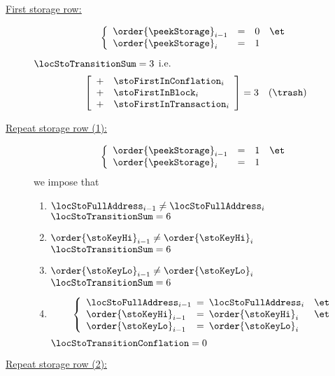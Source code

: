 \begin{description}
	\item[\underline{\underline{First storage row:}}] 
		\If
		\[
			\left\{ \begin{array}{lclc}
				\order{\peekStorage} _{i - 1} & = & 0  & \et \\
				\order{\peekStorage} _{i}     & = & 1 \\
			\end{array} \right.
		\]
		\Then $\locStoTransitionSum = 3$ i.e.
		\[
			\left[ \begin{array}{cl}
				+ & \stoFirstInConflation  _{i} \\
				+ & \stoFirstInBlock       _{i} \\
				+ & \stoFirstInTransaction _{i} \\
			\end{array} \right]
			= 3 \quad (\trash)
		\]
	\item[\underline{\underline{Repeat storage row (1):}}] 
		\If
		\[
			\left\{ \begin{array}{lclc}
				\order{\peekStorage} _{i - 1} & = & 1  & \et \\
				\order{\peekStorage} _{i}     & = & 1 \\
			\end{array} \right.
		\]
		\Then we impose that
		\begin{enumerate}
			\item \If $\locStoFullAddress  _{i - 1} \neq \locStoFullAddress  _{i}$ \Then $\locStoTransitionSum = 6$
			\item \If $\order{\stoKeyHi}   _{i - 1} \neq \order{\stoKeyHi}   _{i}$ \Then $\locStoTransitionSum = 6$
			\item \If $\order{\stoKeyLo}   _{i - 1} \neq \order{\stoKeyLo}   _{i}$ \Then $\locStoTransitionSum = 6$
			\item  \If 
				\[
					\left\{ \begin{array}{lclc}
						\locStoFullAddress _{i - 1} & \!\!\! = \!\!\! & \locStoFullAddress _{i} & \et \\
						\order{\stoKeyHi }_{i - 1}  & \!\!\! = \!\!\! & \order{\stoKeyHi }_{i}  & \et \\
						\order{\stoKeyLo }_{i - 1}  & \!\!\! = \!\!\! & \order{\stoKeyLo }_{i}  &     \\
					\end{array} \right.
				\]
				\Then $\locStoTransitionConflation = 0$
		\end{enumerate}
	\item[\underline{\underline{Repeat storage row (2):}}] 

\end{description}
